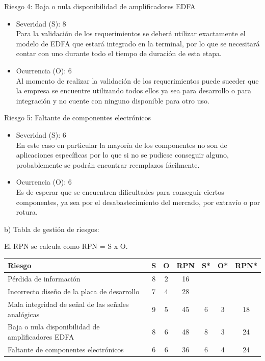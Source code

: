 \documentclass[
11pt, %
]{charter}
\begin{document}
Riesgo 4: Baja o nula disponibilidad de amplificadores EDFA
\begin{itemize}
	\item Severidad (S): 8 \\
	Para la validación de los requerimientos se deberá utilizar exactamente el modelo de EDFA que estará integrado en la terminal, por lo que se necesitará contar con uno durante todo el tiempo de duración de esta etapa.
	\item Ocurrencia (O): 6 \\
	Al momento de realizar la validación de los requerimientos puede suceder que la empresa se encuentre utilizando todos ellos ya sea para desarrollo o para integración y no cuente con ninguno disponible para otro uso.
\end{itemize}

Riesgo 5: Faltante de componentes electrónicos
\begin{itemize}
	\item Severidad (S): 6 \\
	En este caso en particular la mayoría de los componentes no son de aplicaciones específicas por lo que si no se pudiese conseguir alguno, probablemente se podrán encontrar reemplazos fácilmente.
	\item Ocurrencia (O): 6 \\
	Es de esperar que se encuentren dificultades para conseguir ciertos componentes, ya sea por el desabastecimiento del mercado, por extravío o por rotura.
\end{itemize}

b) Tabla de gestión de riesgos:

El RPN se calcula como RPN = S x O.

\begin{table}[H]
\centering
\begin{tabularx}{\linewidth}{@{}|X|c|c|c|c|c|c|@{}}
\hline
\rowcolor[HTML]{C0C0C0} 
Riesgo & S & O & RPN & S* & O* & RPN* \\ \hline
Pérdida de información	& 8 & 2 & 16 &    &    &      \\ \hline
Incorrecto diseño de la placa de desarrollo	& 7 & 4 & 28 &    &    &      \\ \hline
Mala integridad de señal de las señales analógicas	& 9 & 5 & \color{red}45 & 6 & 3 & 18     \\ \hline
Baja o nula disponibilidad de amplificadores EDFA	& 8 & 6 & \color{red}48 & 8 & 3 & 24	\\ \hline
Faltante de componentes electrónicos	& 6 & 6 & \color{red}36 & 6 & 4 & 24	\\ \hline
\end{tabularx}%
\end{table}
\end{document}
